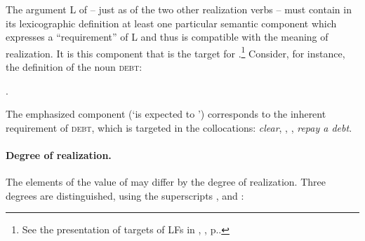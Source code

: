 The argument L of  -- just as of the two other realization verbs -- must contain in its lexicographic definition at least one particular semantic component which expresses a ``requirement'' of L and thus is compatible with the meaning of realization. It is this component that is the target for .\footnote{See the presentation of targets of LFs in , , p.\thinspace\pageref{txt:targetOfSyntLF}.} Consider, for instance, the definition of the noun \textsc{debt}:

\begingroup
\small

\ex. \label{ldef:defDEBT}

\endgroup

The emphasized component (`is expected to ') corresponds to the inherent requirement of \textsc{debt}, which is targeted
in the  collocations: \textit{clear}, , , \textit{repay a debt}.

\paragraph*{Degree of realization.}\label{par:degreesOfReal}

The elements of the value of  may differ by the degree of realization. Three degrees are distinguished, using the superscripts ,  and :

\begingroup
\small

